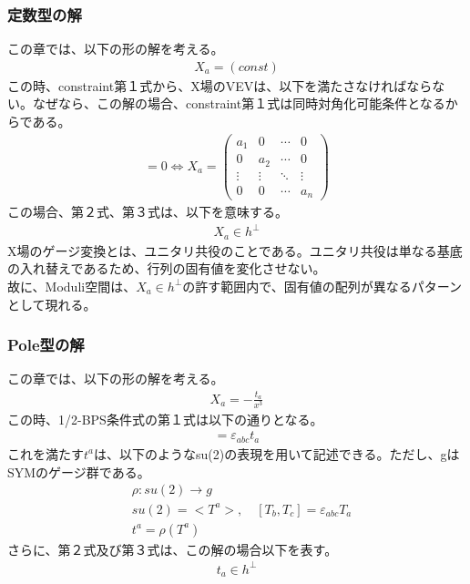 \documentclass[dvipdfmx,a4paper,10.5pt]{article}
\numberwithin{equation}{section}
\begin{document}
\subsubsection{定数型の解}
この章では、以下の形の解を考える。
\begin{align*}
    X_{a}=(const)
\end{align*}
この時、constraint第１式から、X場のVEVは、以下を満たさなければならない。なぜなら、この解の場合、constraint第１式は同時対角化可能条件となるからである。
\begin{align*}
    [X_{b},X_{c}]=0\iff X_{a}=\begin{pmatrix}
a_1 & 0 & \cdots & 0 \\
0 & a_2 & \cdots & 0 \\
\vdots & \vdots & \ddots & \vdots \\
0 & 0 & \cdots & a_n
\end{pmatrix}
\end{align*}
この場合、第２式、第３式は、以下を意味する。
\begin{align*}
    X_{a}\in h^{\perp}
\end{align*}
X場のゲージ変換とは、ユニタリ共役のことである。ユニタリ共役は単なる基底の入れ替えであるため、行列の固有値を変化させない。\\
故に、Moduli空間は、$X_{a}\in h^{\perp}$の許す範囲内で、固有値の配列が異なるパターンとして現れる。

\subsubsection{Pole型の解}
この章では、以下の形の解を考える。
\begin{align*}
    X_{a}=-\frac{t_{a}}{x^{3}}
\end{align*}
この時、1/2-BPS条件式の第１式は以下の通りとなる。
\begin{align*}
    [t_{b},t_{c}]=\varepsilon_{abc}t_{a}
\end{align*}
これを満たす$t^{a}$は、以下のようなsu(2)の表現を用いて記述できる。ただし、gはSYMのゲージ群である。
\begin{align*}
    &\rho:su(2)\to g\\
    &su(2)=<T^{a}>,\quad [T_{b},T_{c}]=\varepsilon_{abc}T_{a}\\
    &t^{a}=\rho(T^{a})
\end{align*}
さらに、第２式及び第３式は、この解の場合以下を表す。
\begin{align*}
    t_{a}\in h^{\perp}
\end{align*}
\end{document}
